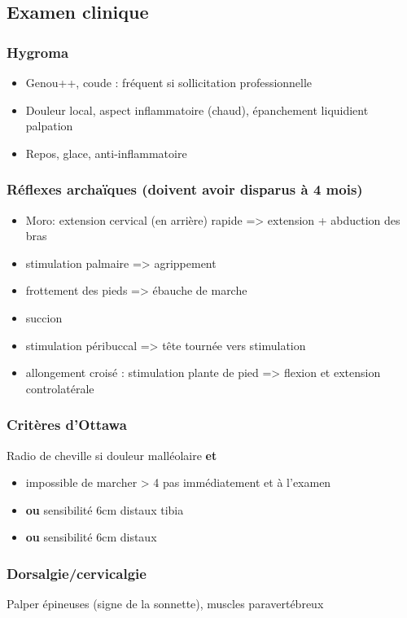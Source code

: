 \documentclass[11pt]{article}
\begin{document}
\subsection{Examen clinique}
\label{sec:org0c1463d}
\subsubsection{Hygroma}
\label{sec:org0a4e46c}
\begin{itemize}
\item Genou++, coude : fréquent si sollicitation professionnelle
\item Douleur local, aspect inflammatoire (chaud), épanchement liquidient palpation
\item Repos, glace, anti-inflammatoire
\end{itemize}
\subsubsection{Réflexes archaïques (doivent avoir disparus à 4 mois)}
\label{sec:orgbe0fc8c}
\begin{itemize}
\item Moro: extension cervical (en arrière) rapide => extension + abduction des bras
\item stimulation palmaire => agrippement
\item frottement des pieds => ébauche de marche
\item succion
\item stimulation péribuccal => tête tournée vers stimulation
\item allongement croisé : stimulation plante de pied => flexion et extension controlatérale
\end{itemize}
\subsubsection{Critères d'Ottawa}
\label{sec:orgd02ea69}
Radio de cheville si douleur malléolaire \textbf{et}
\begin{itemize}
\item impossible de marcher > 4 pas immédiatement et à l'examen
\item \textbf{ou} sensibilité 6cm distaux tibia
\item \textbf{ou} sensibilité 6cm distaux
\end{itemize}
\subsubsection{Dorsalgie/cervicalgie}
\label{sec:org7db61ed}
Palper épineuses (signe de la sonnette), muscles paravertébreux
\end{document}
